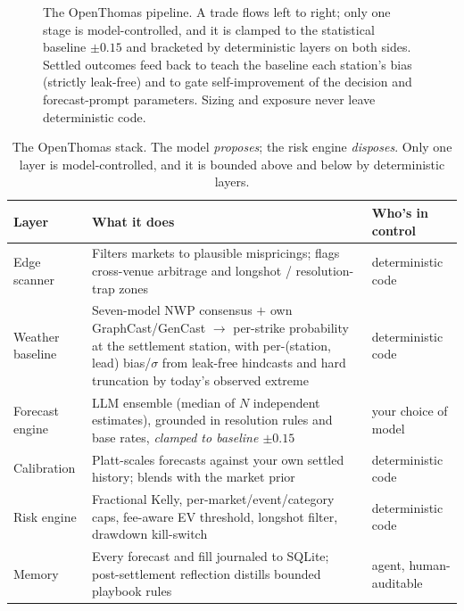\documentclass[sigconf,review,anonymous]{acmart}
\begin{document}
\begin{figure}[t]
\caption{The OpenThomas pipeline. A trade flows left to right; only one stage
is model-controlled, and it is clamped to the statistical baseline $\pm 0.15$
and bracketed by deterministic layers on both sides. Settled outcomes feed back
to teach the baseline each station's bias (strictly leak-free) and to gate
self-improvement of the decision and forecast-prompt parameters. Sizing and
exposure never leave deterministic code.}
\label{fig:pipeline}
\end{figure}

\begin{table}[t]
\centering
\small
\begin{tabular}{@{}p{2.4cm}p{10.2cm}p{2.9cm}@{}}
\toprule
\textbf{Layer} & \textbf{What it does} & \textbf{Who's in control} \\
\midrule
Edge scanner & Filters markets to plausible mispricings; flags cross-venue arbitrage and longshot / resolution-trap zones & deterministic code \\
Weather baseline & Seven-model NWP consensus $+$ own GraphCast/GenCast $\to$ per-strike probability at the settlement station, with per-(station, lead) bias/$\sigma$ from leak-free hindcasts and hard truncation by today's observed extreme & deterministic code \\
Forecast engine & LLM ensemble (median of $N$ independent estimates), grounded in resolution rules and base rates, \emph{clamped to baseline $\pm 0.15$} & your choice of model \\
Calibration & Platt-scales forecasts against your own settled history; blends with the market prior & deterministic code \\
Risk engine & Fractional Kelly, per-market/event/category caps, fee-aware EV threshold, longshot filter, drawdown kill-switch & deterministic code \\
Memory & Every forecast and fill journaled to SQLite; post-settlement reflection distills bounded playbook rules & agent, human-auditable \\
\bottomrule
\end{tabular}
\caption{The OpenThomas stack. The model \emph{proposes}; the risk engine
\emph{disposes}. Only one layer is model-controlled, and it is bounded above and
below by deterministic layers.}
\label{tab:layers}
\end{table}
\end{document}
